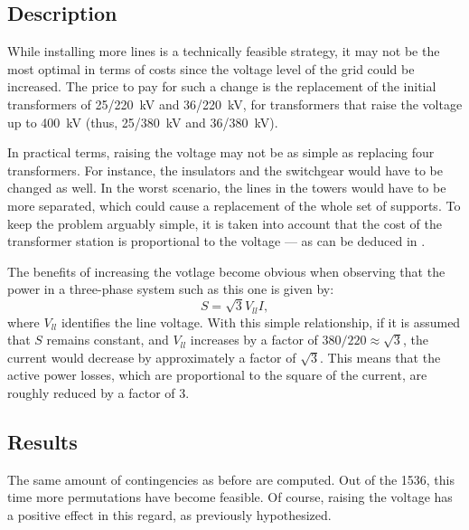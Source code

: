 \subsection{Description}
While installing more lines is a technically feasible strategy, it may not be the most optimal in terms of costs since the voltage level of the grid could be increased. The price to pay for such a change is the replacement of the initial transformers of 25/220~kV and 36/220~kV, for transformers that raise the voltage up to 400~kV (thus, 25/380~kV and 36/380~kV).

In practical terms, raising the voltage may not be as simple as replacing four transformers. For instance, the insulators and the switchgear would have to be changed as well. In the worst scenario, the lines in the towers would have to be more separated, which could cause a replacement of the whole set of supports. To keep the problem arguably simple, it is taken into account that the cost of the transformer station is proportional to the voltage --- as can be deduced in \cite{acer}.

The benefits of increasing the votlage become obvious when observing that the power in a three-phase system such as this one is given by:
\begin{equation}
  S = \sqrt{3}V_{ll}I,
\end{equation}
where $V_{ll}$ identifies the line voltage. With this simple relationship, if it is assumed that $S$ remains constant, and $V_{ll}$ increases by a factor of $380/220\approx \sqrt{3}$, the current would decrease by approximately a factor of $\sqrt{3}$. This means that the active power losses, which are proportional to the square of the current, are roughly reduced by a factor of 3. 



\subsection{Results}
The same amount of contingencies as before are computed. Out of the 1536, this time more permutations have become feasible. Of course, raising the voltage has a positive effect in this regard, as previously hypothesized. 


